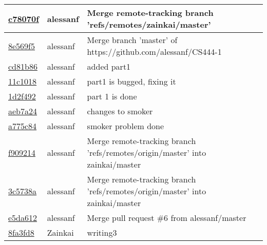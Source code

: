 \begin{tabular}{l l l}
\href{https://github.com/zainkai/CS444/commit/c78070fcfcf3a16ec999190abb19edfcee4fef0c}{c78070f} & alessanf & Merge remote-tracking branch 'refs/remotes/zainkai/master'\\\hline
\href{https://github.com/zainkai/CS444/commit/8e569f56441fbe67860382e4cd39816c39dcdc40}{8e569f5} & alessanf & Merge branch 'master' of https://github.com/alessanf/CS444-1\\\hline
\href{https://github.com/zainkai/CS444/commit/cd81b86b888c4b4ac37193c7036e8fbab3a6b855}{cd81b86} & alessanf & added part1\\\hline
\href{https://github.com/zainkai/CS444/commit/11c1018c9cbbd0db3668ad5e5f8e8de8a14cc8e2}{11c1018} & alessanf & part1 is bugged, fixing it\\\hline
\href{https://github.com/zainkai/CS444/commit/1d2f492c2d2634a67881b6a91c78c38a8c4fcf3b}{1d2f492} & alessanf & part 1 is done\\\hline
\href{https://github.com/zainkai/CS444/commit/aeb7a2492835ea2e0ce3fd8afd81be47c140c7cd}{aeb7a24} & alessanf & changes to smoker\\\hline
\href{https://github.com/zainkai/CS444/commit/a775c84bbe228a41210798c53400395878a77588}{a775c84} & alessanf & smoker problem done\\\hline
\href{https://github.com/zainkai/CS444/commit/f90921414a60c2807a15dd69599080a310d91552}{f909214} & alessanf & Merge remote-tracking branch 'refs/remotes/origin/master' into zainkai/master\\\hline
\href{https://github.com/zainkai/CS444/commit/3c5738afb23b99bb452ffba8dea432bb81bfaa66}{3c5738a} & alessanf & Merge remote-tracking branch 'refs/remotes/origin/master' into zainkai/master\\\hline
\href{https://github.com/zainkai/CS444/commit/e5da61207fb0c228a55aa2af1f8e1b12c9b20b71}{e5da612} & alessanf & Merge pull request \#6 from alessanf/master\\\hline
\href{https://github.com/zainkai/CS444/commit/8fa3fd8f2913a4036814808598ab87ae0bf9ded7}{8fa3fd8} & Zainkai & writing3\\\hline\end{tabular}
